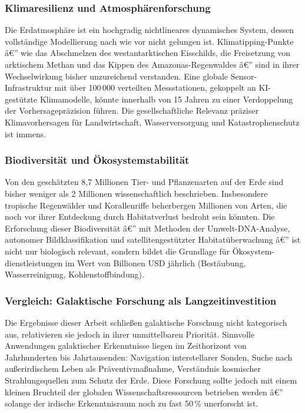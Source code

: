 ﻿\documentclass[a4paper,12pt]{article}
\theoremstyle{definition}
\begin{document}
\subsubsection{Klimaresilienz und Atmosphärenforschung}

Die Erdatmosphäre ist ein hochgradig nichtlineares dynamisches System, dessen
vollständige Modellierung nach wie vor nicht gelungen ist. Klimatipping-Punkte
â€” wie das Abschmelzen des westantarktischen Eisschilds, die Freisetzung von
arktischem Methan und das Kippen des Amazonas-Regenwaldes â€” sind in ihrer
Wechselwirkung bisher unzureichend verstanden. Eine globale Sensor-Infrastruktur
mit über 100\,000 verteilten Messstationen, gekoppelt an KI-gestützte
Klimamodelle, könnte innerhalb von 15 Jahren zu einer Verdoppelung der
Vorhersagepräzision führen. Die gesellschaftliche Relevanz präziser
Klimavorhersagen für Landwirtschaft, Wasserversorgung und Katastrophenschutz
ist immens.

\subsubsection{Biodiversität und Ökosystemstabilität}

Von den geschätzten 8{,}7 Millionen Tier- und Pflanzenarten auf der Erde sind
bisher weniger als 2 Millionen wissenschaftlich beschrieben. Insbesondere
tropische Regenwälder und Korallenriffe beherbergen Millionen von Arten, die
noch vor ihrer Entdeckung durch Habitatverlust bedroht sein könnten. Die
Erforschung dieser Biodiversität â€” mit Methoden der Umwelt-DNA-Analyse,
autonomer Bildklassifikation und satellitengestützter Habitatüberwachung â€”
ist nicht nur biologisch relevant, sondern bildet die Grundlage für Ökosystem-
dienstleistungen im Wert von Billionen USD jährlich (Bestäubung, Wasserreinigung,
Kohlenstoffbindung).

\subsubsection{Vergleich: Galaktische Forschung als Langzeitinvestition}

Die Ergebnisse dieser Arbeit schließen galaktische Forschung nicht kategorisch
aus, relativieren sie jedoch in ihrer unmittelbaren Priorität. Sinnvolle
Anwendungen galaktischer Erkenntnisse liegen im Zeithorizont von Jahrhunderten
bis Jahrtausenden: Navigation interstellarer Sonden, Suche nach außerirdischem
Leben als Präventivmaßnahme, Verständnis kosmischer Strahlungsquellen zum
Schutz der Erde. Diese Forschung sollte jedoch mit einem kleinen Bruchteil der
globalen Wissenschaftsressourcen betrieben werden â€” solange der irdische
Erkenntnisraum noch zu fast 50\,\% unerforscht ist.
\end{document}
